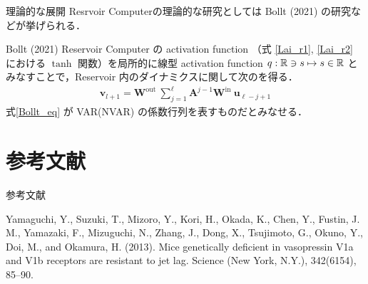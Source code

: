 \begin{frame}{理論的な展開}
    Resrvoir Computerの理論的な研究としては Bollt (2021) の研究などが挙げられる．
    \begin{block}{Bollt (2021)}
        Reservoir Computer の activation function （式 \eqref{Lai_r1}, \eqref{Lai_r2} における $\tanh$ 関数）を局所的に線型 activation function $q:\mathbb{R} \ni s \mapsto s \in \mathbb{R}$ とみなすことで，Reservoir 内のダイナミクスに関して次のを得る． \vspace{-.5cm}
        \begin{align}
            \mathbf{v}_{l+1} = \mathbf{W}^{\text {out }} \sum_{j=1}^{\ell} \mathbf{A}^{j-1} \mathbf{W}^{\text {in }} \mathbf{u}_{\ell-j+1} \label{Bollt_eq}
        \end{align}
        式\eqref{Bollt_eq} が VAR(NVAR) の係数行列を表すものだとみなせる．
    \end{block}

\end{frame}


\section{参考文献}
\begin{frame}{参考文献}
    \begin{thebibliography}{99}    
        Yamaguchi, Y., Suzuki, T., Mizoro, Y., Kori, H., Okada, K., Chen, Y., Fustin, J. M., Yamazaki, F., Mizuguchi, N., Zhang, J., Dong, X., Tsujimoto, G., Okuno, Y., Doi, M., and Okamura, H. (2013). Mice genetically deficient in vasopressin V1a and V1b receptors are resistant to jet lag. Science (New York, N.Y.), 342(6154), 85–90. 

    \end{thebibliography}
\end{frame}

